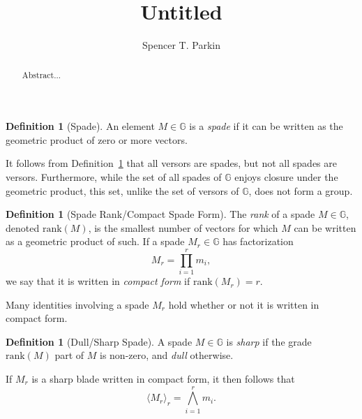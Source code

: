 \documentclass{birkjour}
\theoremstyle{definition}
\newtheorem{defn}[thm]{Definition}
\theoremstyle{remark}
\numberwithin{equation}{section}
\newcommand{\G}{\mathbb{G}}
\newcommand{\rank}{\mbox{rank}}
\begin{document}
\title{Untitled}

\author{Spencer T. Parkin}



\begin{abstract}
Abstract...
\end{abstract}


\maketitle

\begin{defn}[Spade]\label{def_spade}
An element $M\in\G$ is a \emph{spade} if it can be written as the geometric
product of zero or more vectors.
\end{defn}

It follows from Definition~\ref{def_spade} that all versors are spades, but not all spades are versors.
Furthermore, while the set of all spades of $\G$ enjoys closure under the geometric product, this set,
unlike the set of versors of $\G$, does not form a group.

\begin{defn}[Spade Rank/Compact Spade Form]\label{def_spader_rank}
The \emph{rank} of a spade $M\in\G$, denoted $\rank(M)$, is the smallest number of vectors for which $M$ can
be written as a geometric product of such.  If a spade $M_r\in\G$ has factorization
\begin{equation*}
M_r=\prod_{i=1}^r m_i,
\end{equation*}
we say that it is written in \emph{compact form} if $\rank(M_r)=r$.
\end{defn}

Many identities involving a spade $M_r$ hold whether or not it is written in compact form.

\begin{defn}[Dull/Sharp Spade]
A spade $M\in\G$ is \emph{sharp} if the grade $\rank(M)$ part of $M$ is non-zero, and \emph{dull} otherwise.
\end{defn}

If $M_r$ is a sharp blade written in compact form, it then follows that
\begin{equation*}
\langle M_r\rangle_r = \bigwedge_{i=1}^r m_i.
\end{equation*}
\end{document}
